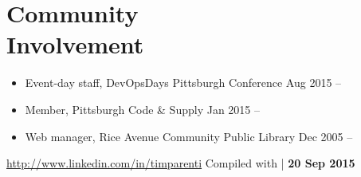 \documentclass[11pt]{article}
\newcommand{\lmr}{\fontfamily{lmr}\selectfont} %
\newcommand{\present}{\phantom{Xxx 20XX}}
\newcommand{\itemizeonly}{\leavevmode\par\vspace{\dimexpr-\baselineskip-\parskip}}
\begin{document}
\section{Community\\ Involvement}

\itemizeonly
\begin{itemize}
	\item Event-day staff, DevOpsDays Pittsburgh Conference
		\hfill Aug 2015 -- \present
	\item Member, Pittsburgh Code \& Supply
		\hfill Jan 2015 -- \present
	\item Web manager, Rice Avenue Community Public Library
		\hfill Dec 2005 -- \present
\end{itemize}



\begin{adjustwidth}{-1in}{0pt}
	\hrulefill \par
	\hypersetup{linkcolor=gray}
	\small
	\url{http://www.linkedin.com/in/timparenti} \hfill {\lmr Compiled with \XeLaTeX} | \textbf{20 Sep 2015}
\end{adjustwidth}
\end{document}
